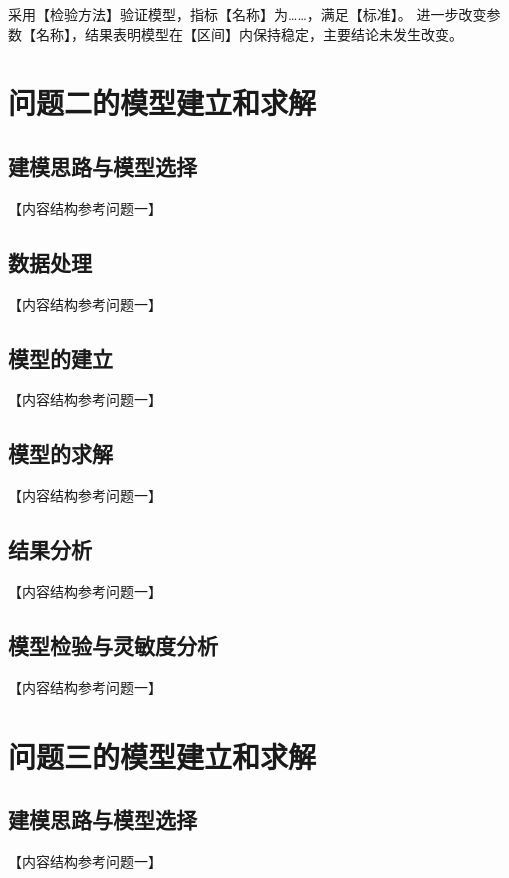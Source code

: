 \documentclass[withoutpreface,bwprint]{cumcmthesis}
\begin{document}
采用【检验方法】验证模型，指标【名称】为……，满足【标准】。
进一步改变参数【名称】，结果表明模型在【区间】内保持稳定，主要结论未发生改变。

\newpage
\section{问题二的模型建立和求解}

\subsection{建模思路与模型选择}
【内容结构参考问题一】

\subsection{数据处理}
【内容结构参考问题一】

\subsection{模型的建立}
【内容结构参考问题一】

\subsection{模型的求解}
【内容结构参考问题一】

\subsection{结果分析}
【内容结构参考问题一】

\subsection{模型检验与灵敏度分析}
【内容结构参考问题一】

\newpage
\section{问题三的模型建立和求解}

\subsection{建模思路与模型选择}
【内容结构参考问题一】
\end{document}
